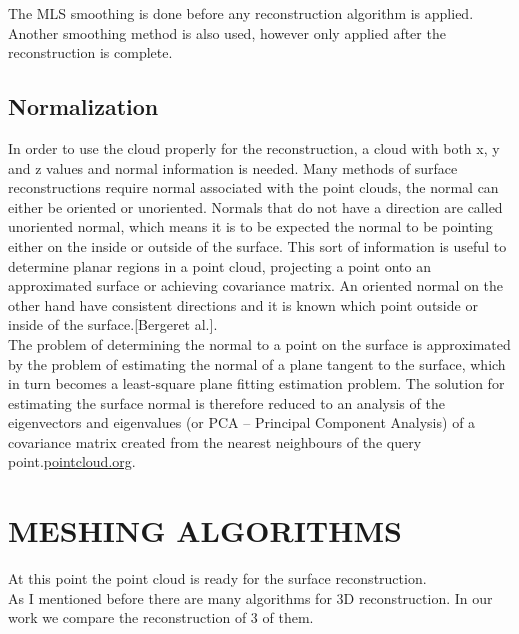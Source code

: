 \documentclass[paper=a4, fontsize=11pt]{scrartcl}	%
\numberwithin{equation}{section}															%
\numberwithin{figure}{section}																%
\numberwithin{table}{section}																%
\begin{document}
\begin{center}
	

	
	
	
\end{center}
The MLS smoothing is done before any reconstruction algorithm is applied. Another
smoothing method is also used, however only applied after the reconstruction is complete.
\subsection{Normalization}
In order to use the cloud properly for the reconstruction, a cloud with both x, y and z values and normal information is needed.
Many methods of surface reconstructions require normal associated with the point
clouds, the normal can either be oriented or unoriented. Normals that do not have a
direction are called unoriented normal, which means it is to be expected the normal to be pointing either on the inside or outside of the surface. This sort of information is useful to determine planar regions in a point cloud, projecting a point onto an approximated surface or achieving covariance matrix. An oriented normal on the other hand have consistent directions and it is known which point outside or inside of the surface.[Bergeret al.].\\
The problem of determining the normal to a point on the surface is approximated by the problem of estimating the normal of a plane tangent to the surface, which in turn becomes a least-square plane fitting estimation problem. The solution for estimating the surface normal is therefore reduced to an analysis of the eigenvectors and eigenvalues (or PCA – Principal Component Analysis) of a covariance matrix created from the nearest neighbours of the query point.\url{pointcloud.org}.\\

\section{MESHING ALGORITHMS}
At this point the point cloud is ready for the surface reconstruction.\\
As I mentioned before there are many algorithms for 3D reconstruction. In our work we compare the reconstruction of 3 of them. 
\end{document}
